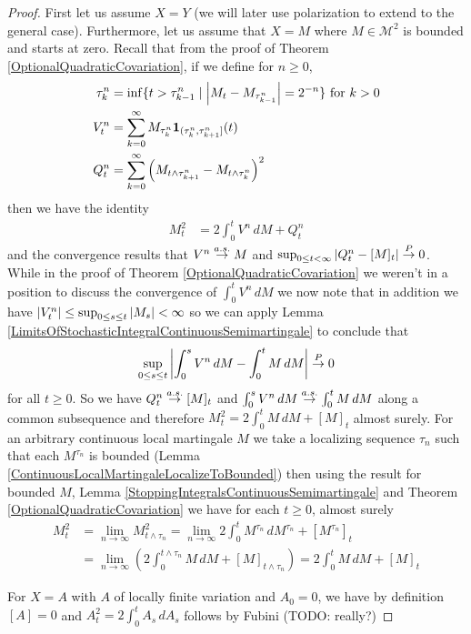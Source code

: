 \begin{proof}
First let us assume $X =Y$ (we will later use polarization to extend to the general case).  Furthermore, let us assume that $X = M$ where $M \in \mathcal{M}^2$ is bounded and starts at zero.  Recall that from the proof of Theorem \ref{OptionalQuadraticCovariation}, if we define for $n \geq 0$,
\begin{align*} 
\tau^n_k &= \inf \lbrace t > \tau^n_{k-1} \mid \left \vert M_t - M_{\tau^n_{k-1}} \right \vert = 2^{-n} \rbrace \text{ for $k > 0$} \\
V^n_t &= \sum_{k=0}^\infty M_{\tau^n_{k}} \textbf{1}_{(\tau^n_{k}, \tau^n_{k+1}]}(t) \\ 
Q^n_t &= \sum_{k=0}^\infty \left (M_{t \wedge \tau^n_{k+1}}  - M_{t \wedge \tau^n_k}\right)^2 
\end{align*}
then we have the identity
\begin{align*}
M^2_t &= 2 \int_0^t V^n \, dM + Q^n_t
\end{align*}
and the convergence results that $V^n \overset{a.s.}\to M$ and $\sup_{0 \leq t < \infty} \left \vert Q^n_t - [M]_t \right \vert \overset{P}\to 0$.  While in the proof of Theorem \ref{OptionalQuadraticCovariation} we weren't in a position to discuss the convergence of $\int_0^t V^n \, dM$ we now note that in addition we have $\left \vert V^n_t \right \vert \leq \sup_{0 \leq s \leq t} \left \vert M_s \right \vert < \infty$ so we can apply Lemma \ref{LimitsOfStochasticIntegralContinuousSemimartingale} to conclude that 
\begin{align*}
\sup_{0 \leq s \leq t} \left \vert \int_0^s V^n \, dM - \int_0^t M \, dM \right \vert \overset{P}\to 0
\end{align*}
for all $t \geq 0$.  So we have $Q^n_t \overset{a.s.}\to [M]_t$ and $\int_0^s V^n \, dM  \overset{a.s.}\to \int_0^t M \, dM$ along a common subsequence and therefore $M^2_t = 2 \int_0^t M \, dM + [M]_t$ almost surely.  For an arbitrary continuous local martingale $M$ we take a localizing sequence $\tau_n$ such that each $M^{\tau_n}$ is bounded (Lemma \ref{ContinuousLocalMartingaleLocalizeToBounded}) then using the result for bounded $M$, Lemma \ref{StoppingIntegralsContinuousSemimartingale} and Theorem \ref{OptionalQuadraticCovariation} we have for each $t \geq 0$, almost surely
\begin{align*}
M_t^2 &= \lim_{n \to \infty} M^2_{t \wedge \tau_n} = \lim_{n \to \infty} 2 \int_0^{t} M^{\tau_n} \, dM^{\tau_n} + [M^{\tau_n}]_t \\
&=\lim_{n \to \infty} \left( 2 \int_0^{t \wedge \tau_n} M \, dM + [M]_{t \wedge \tau_n} \right) = 2 \int_0^{t} M \, dM + [M]_{t} 
\end{align*}

For $X = A$ with $A$ of locally finite variation and $A_0 = 0$, we have by definition $[A] = 0$ and $A_t^2 = 2 \int_0^t A_s \, dA_s$ follows by Fubini (TODO: really?)
\end{proof}
